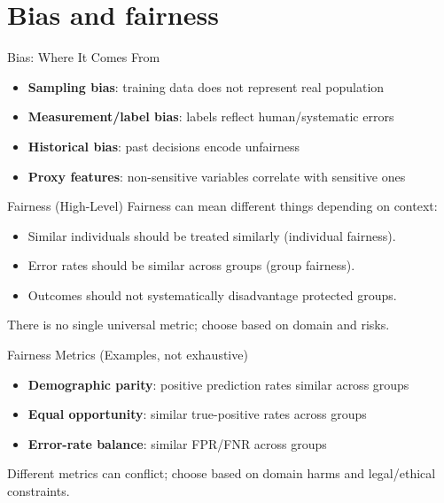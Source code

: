 \documentclass[aspectratio=169]{beamer}
\begin{document}
\section{Bias and fairness}
\label{sec:bias}

\begin{frame}{Bias: Where It Comes From}
  \begin{itemize}[<+->]
    \item \textbf{Sampling bias}: training data does not represent real population
    \item \textbf{Measurement/label bias}: labels reflect human/systematic errors
    \item \textbf{Historical bias}: past decisions encode unfairness
    \item \textbf{Proxy features}: non-sensitive variables correlate with sensitive ones
  \end{itemize}
\end{frame}

\begin{frame}{Fairness (High-Level)}
  Fairness can mean different things depending on context:
  \begin{itemize}[<+->]
    \item Similar individuals should be treated similarly (individual fairness).
    \item Error rates should be similar across groups (group fairness).
    \item Outcomes should not systematically disadvantage protected groups.
  \end{itemize}
  \vspace{0.4em}
  There is no single universal metric; choose based on domain and risks.
\end{frame}

\begin{frame}{Fairness Metrics (Examples, not exhaustive)}
  \begin{itemize}[<+->]
    \item \textbf{Demographic parity}: positive prediction rates similar across groups
    \item \textbf{Equal opportunity}: similar true-positive rates across groups
    \item \textbf{Error-rate balance}: similar FPR/FNR across groups
  \end{itemize}
  \vspace{0.3em}
  \small Different metrics can conflict; choose based on domain harms and legal/ethical constraints.
\end{frame}
\end{document}
